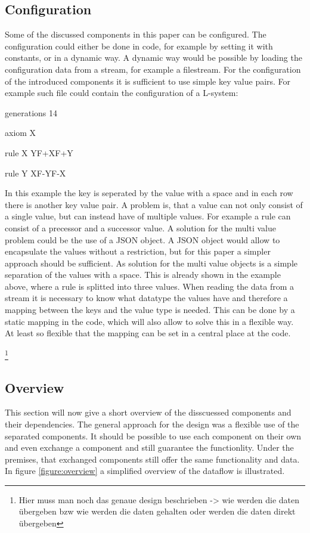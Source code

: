 \documentclass[english]{cpp-hmwk}
\begin{document}
\subsection{Configuration}
Some of the discussed components in this paper can be configured. The configuration could either be done in code, for example by setting it with constants, or in a dynamic way. A dynamic way would be possible by loading the configuration data from a stream, for example a filestream.
For the configuration of the introduced components it is sufficient to use simple key value pairs. For example such file could contain the configuration of a L-system:

\medskip

generations 14

axiom X

rule X YF+XF+Y

rule Y XF-YF-X

\medskip

\noindent In this example the key is seperated by the value with a space and in each row there is another key value pair. A problem is, that a value can not only consist of a single value, but can instead have of multiple values. For example a rule can consist of a precessor and a successor value. 
A solution for the multi value problem could be the use of a JSON object. A JSON object would allow to encapsulate the values without a restriction, but for this paper a simpler approach should be sufficient. As solution for the multi value objects is a simple separation of the values with a space. This is already shown in the example above, where a rule is splitted into three values.
When reading the data from a stream it is necessary to know what datatype the values have and therefore a mapping between the keys and the value type is needed. This can be done by a static mapping in the code, which will also allow to solve this in a flexible way. At least so flexible that the mapping can be set in a central place at the code.

\footnote{Hier muss man noch das genaue design beschrieben -> wie werden die daten übergeben bzw wie werden die daten gehalten oder werden die daten direkt übergeben }

\subsection{Overview}
This section will now give a short overview of the disscuessed components and their dependencies. The general approach for the design was a flexible use of the separated components. It should be possible to use each component on their own and even exchange a component and still guarantee the functionlity. Under the premises, that exchanged components still offer the same functionality and data. In figure \ref{figure:overview} a simplified overview of the dataflow is illustrated. 
\end{document}
